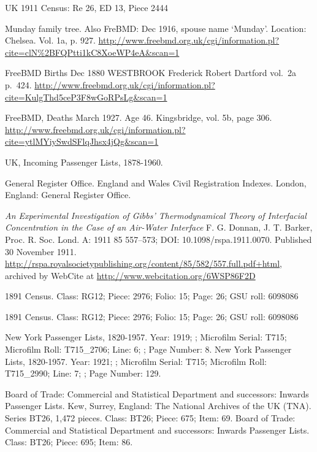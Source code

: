 \begin{thebibliography}{99}
	UK 1911 Census: Re 26, ED 13, Piece 2444

	Munday family tree.
	Also FreBMD: Dec 1916, spouse name `Munday'. Location: Chelsea. Vol. 1a, p. 927.
	\url{http://www.freebmd.org.uk/cgi/information.pl?cite=clN\%2BFQPtti1kC8XoeWP4eA&scan=1}

	FreeBMD Births Dec 1880
	WESTBROOK Frederick Robert Dartford vol.~2a p.~424.
	\url{http://www.freebmd.org.uk/cgi/information.pl?cite=KulgThd5ceP3F8wGoRPsLg&scan=1}

	 FreeBMD, Deaths March 1927. Age 46. Kingsbridge, vol. 5b, page 306.
	\url{http://www.freebmd.org.uk/cgi/information.pl?cite=ytlMYiySwdSFlqJhsx4jQg&scan=1}

	UK, Incoming Passenger Lists, 1878-1960.

	General Register Office. England and Wales Civil Registration Indexes. London, England: General Register Office.

	\emph{An Experimental Investigation of Gibbs' Thermodynamical Theory of Interfacial Concentration in the Case of an Air-Water Interface}
	F. G. Donnan, J. T. Barker,
	Proc. R. Soc. Lond. A: 1911 85 557--573; DOI: 10.1098/rspa.1911.0070. Published 30 November 1911.
	\url{http://rspa.royalsocietypublishing.org/content/85/582/557.full.pdf+html},
	archived by WebCite at \url{http://www.webcitation.org/6WSP86F2D}

	 1891 Census. Class: RG12; Piece: 2976; Folio: 15; Page: 26; GSU roll: 6098086

	1891 Census. Class: RG12; Piece: 2976; Folio: 15; Page: 26; GSU roll: 6098086

	New York Passenger Lists, 1820-1957.
	Year: 1919; ; Microfilm Serial: T715; Microfilm Roll: T715\_2706; Line: 6; ; Page Number: 8.
	New York Passenger Lists, 1820-1957.
	Year: 1921; ; Microfilm Serial: T715; Microfilm Roll: T715\_2990; Line: 7; ; Page Number: 129.

	Board of Trade: Commercial and Statistical Department and successors: Inwards Passenger Lists. Kew, Surrey, England: The National Archives of the UK (TNA). Series BT26, 1,472 pieces.
	Class: BT26; Piece: 675; Item: 69.
	Board of Trade: Commercial and Statistical Department and successors: Inwards Passenger Lists.
	Class: BT26; Piece: 695; Item: 86.


\end{thebibliography}
